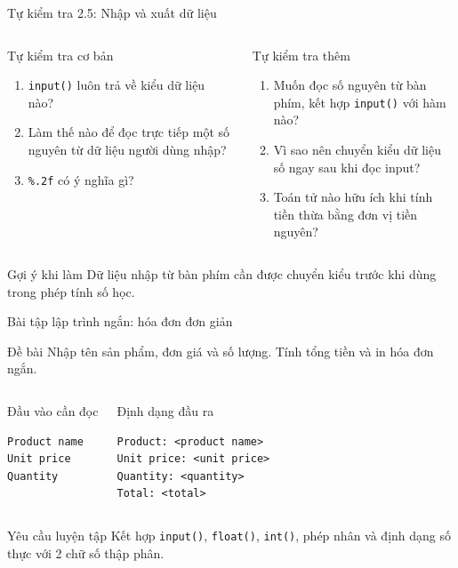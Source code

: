 \documentclass[aspectratio=169,10pt]{beamer}
\begin{document}
\begin{frame}{Tự kiểm tra 2.5: Nhập và xuất dữ liệu}
\small
\begin{columns}[T,onlytextwidth]
\begin{block}{Tự kiểm tra cơ bản}
\begin{enumerate}
  \item \texttt{input()} luôn trả về kiểu dữ liệu nào?
  \item Làm thế nào để đọc trực tiếp một số nguyên từ dữ liệu người dùng nhập?
  \item \texttt{\%.2f} có ý nghĩa gì?
\end{enumerate}
\end{block}
\begin{block}{Tự kiểm tra thêm}
\begin{enumerate}
  \item Muốn đọc số nguyên từ bàn phím, kết hợp \texttt{input()} với hàm nào?
  \item Vì sao nên chuyển kiểu dữ liệu số ngay sau khi đọc input?
  \item Toán tử nào hữu ích khi tính tiền thừa bằng đơn vị tiền nguyên?
\end{enumerate}
\end{block}
\end{columns}
\begin{alertblock}{Gợi ý khi làm}
Dữ liệu nhập từ bàn phím cần được chuyển kiểu trước khi dùng trong phép tính số học.
\end{alertblock}
\end{frame}

\begin{frame}[fragile]{Bài tập lập trình ngắn: hóa đơn đơn giản}
\small
\begin{block}{Đề bài}
Nhập tên sản phẩm, đơn giá và số lượng. Tính tổng tiền và in hóa đơn ngắn.
\end{block}
\begin{columns}[T,onlytextwidth]
\begin{block}{Đầu vào cần đọc}
\begin{lstlisting}[language={}]
Product name
Unit price
Quantity
\end{lstlisting}
\end{block}
\begin{block}{Định dạng đầu ra}
\begin{lstlisting}[language={}]
Product: <product name>
Unit price: <unit price>
Quantity: <quantity>
Total: <total>
\end{lstlisting}
\end{block}
\end{columns}
\begin{alertblock}{Yêu cầu luyện tập}
Kết hợp \texttt{input()}, \texttt{float()}, \texttt{int()}, phép nhân và định dạng số thực với 2 chữ số thập phân.
\end{alertblock}
\end{frame}
\end{document}
